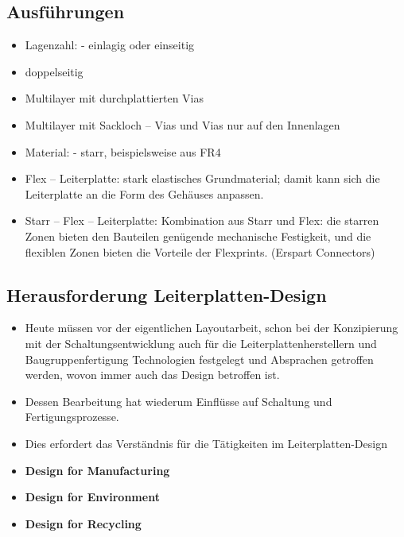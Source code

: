 \subsection{Ausführungen}
\begin{itemize}
  \item Lagenzahl: - einlagig oder einseitig
  \item doppelseitig
  \item  Multilayer mit durchplattierten Vias
  \item  Multilayer mit Sackloch – Vias und Vias nur auf den Innenlagen
  \item Material: - starr, beispielsweise aus FR4
  \item Flex – Leiterplatte: stark elastisches Grundmaterial; damit kann sich
  die Leiterplatte an die Form des Gehäuses anpassen.
  \item Starr – Flex – Leiterplatte: Kombination aus Starr und Flex: die starren
  Zonen bieten den Bauteilen genügende mechanische Festigkeit, und die flexiblen
  Zonen bieten die Vorteile der Flexprints. (Erspart Connectors)
\end{itemize}

\subsection{Herausforderung Leiterplatten-Design}
\begin{itemize}
  \item Heute müssen vor der eigentlichen Layoutarbeit, schon bei der
  Konzipierung mit der Schaltungsentwicklung auch für die
  Leiterplattenherstellern und Baugruppenfertigung Technologien festgelegt und Absprachen getroffen werden, wovon immer auch das Design betroffen ist.
  \item Dessen Bearbeitung hat wiederum Einflüsse auf Schaltung und
  Fertigungsprozesse.
  \item Dies erfordert das Verständnis für die Tätigkeiten im
  Leiterplatten-Design
  \item \textbf{Design for Manufacturing}
  \item \textbf{Design for Environment}
  \item \textbf{Design for Recycling}
\end{itemize}

